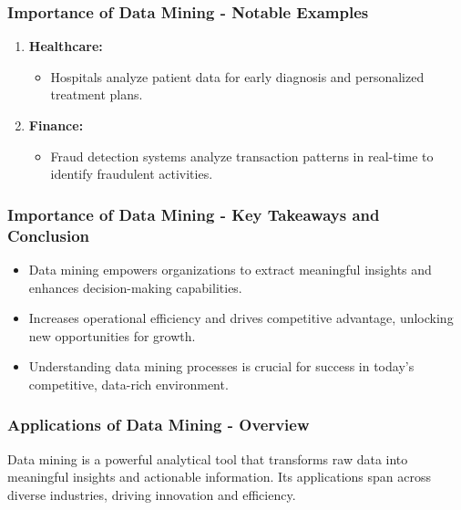 \documentclass{beamer}
\begin{document}
\begin{frame}[fragile]
    \frametitle{Importance of Data Mining - Notable Examples}
    \begin{enumerate}
        \item \textbf{Healthcare:}
            \begin{itemize}
                \item Hospitals analyze patient data for early diagnosis and personalized treatment plans.
            \end{itemize}
        \item \textbf{Finance:}
            \begin{itemize}
                \item Fraud detection systems analyze transaction patterns in real-time to identify fraudulent activities.
            \end{itemize}
    \end{enumerate}
\end{frame}

\begin{frame}[fragile]
    \frametitle{Importance of Data Mining - Key Takeaways and Conclusion}
    \begin{itemize}
        \item Data mining empowers organizations to extract meaningful insights and enhances decision-making capabilities.
        \item Increases operational efficiency and drives competitive advantage, unlocking new opportunities for growth.
        \item Understanding data mining processes is crucial for success in today's competitive, data-rich environment.
    \end{itemize}
\end{frame}

\begin{frame}[fragile]
    \frametitle{Applications of Data Mining - Overview}
    Data mining is a powerful analytical tool that transforms raw data into meaningful insights and actionable information. Its applications span across diverse industries, driving innovation and efficiency.
\end{frame}
\end{document}
